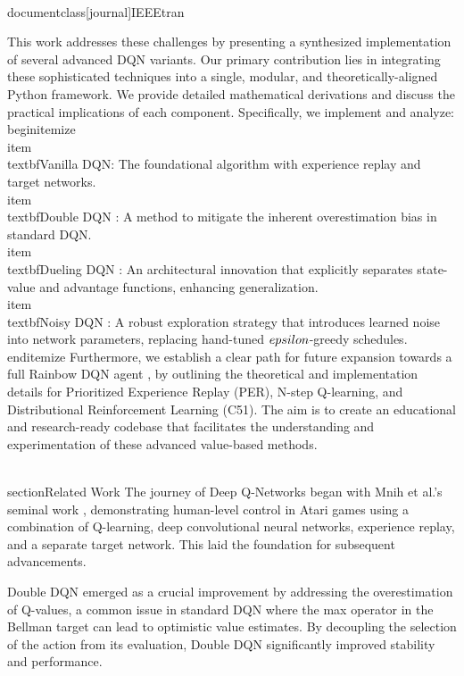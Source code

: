 \\documentclass[journal]{IEEEtran}
\begin{document}
This work addresses these challenges by presenting a synthesized implementation of several advanced DQN variants. Our primary contribution lies in integrating these sophisticated techniques into a single, modular, and theoretically-aligned Python framework. We provide detailed mathematical derivations and discuss the practical implications of each component. Specifically, we implement and analyze:
\\begin{itemize}
    \\item \\textbf{Vanilla DQN}: The foundational algorithm with experience replay and target networks.
    \\item \\textbf{Double DQN} \cite{vanhasselt2015deep}: A method to mitigate the inherent overestimation bias in standard DQN.
    \\item \\textbf{Dueling DQN} \cite{wang2016dueling}: An architectural innovation that explicitly separates state-value and advantage functions, enhancing generalization.
    \\item \\textbf{Noisy DQN} \cite{fortunato2017noisy}: A robust exploration strategy that introduces learned noise into network parameters, replacing hand-tuned $\\epsilon$-greedy schedules.
\\end{itemize}
Furthermore, we establish a clear path for future expansion towards a full Rainbow DQN agent \cite{hessel2017rainbow}, by outlining the theoretical and implementation details for Prioritized Experience Replay (PER), N-step Q-learning, and Distributional Reinforcement Learning (C51). The aim is to create an educational and research-ready codebase that facilitates the understanding and experimentation of these advanced value-based methods.

\\section{Related Work}
The journey of Deep Q-Networks began with Mnih et al.'s seminal work \cite{mnih2013playing, mnih2015human}, demonstrating human-level control in Atari games using a combination of Q-learning, deep convolutional neural networks, experience replay, and a separate target network. This laid the foundation for subsequent advancements.

Double DQN \cite{vanhasselt2015deep} emerged as a crucial improvement by addressing the overestimation of Q-values, a common issue in standard DQN where the max operator in the Bellman target can lead to optimistic value estimates. By decoupling the selection of the action from its evaluation, Double DQN significantly improved stability and performance.
\end{document}
